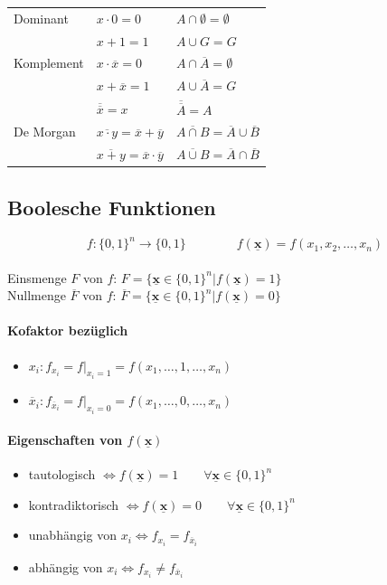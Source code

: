 \documentclass[6pt,a4paper]{scrartcl}
\renewcommand{\vec}[1]{\ensuremath{\underline{\boldsymbol {#1}}}}
\newcommand{\ra}[0]{\ensuremath{\rightarrow}} 									%
\renewcommand{\vec}[1]{\ensuremath{\underline{\boldsymbol {#1}}}}
\begin{document}
\begin{multicols*}{3}
\begin{tabular}{l|l|l}
		Dominant    & $x \cdot 0 = 0$                                       & $A \cap \emptyset = \emptyset$                        \\
		            & $x + 1 = 1$                                           & $A \cup G = G$                                        \\
		Komplement  & $x \cdot \overline{x} = 0$                            & $A \cap \overline{A} = \emptyset$                     \\
		            & $x + \overline{x} = 1$                                & $A \cup \overline{A} = G$                             \\
		            & $\overline{\overline{x}} = x$                         & $\overline{\overline{A}} = A$                         \\
		De Morgan   & $\overline{x \cdot y} = \overline{x} + \overline{y}$  & $\overline{A \cap B} = \overline{A} \cup \overline{B}$\\
		            & $\overline{x + y} = \overline{x} \cdot \overline{y}$ & $\overline{A \cup B} = \overline{A} \cap \overline{B}$
	\end{tabular}


	\subsection{Boolesche Funktionen}
	\begin{equation*}
	f:\{0,1\}^n\ra \{0,1\} \qquad \qquad f(\vec{x})=f(x_1,x_2,\dots,x_n)
	\end{equation*} \\
	Einsmenge $F$ von $f$: $F=\{\vec{x}\in \{0,1\}^n|f(\vec{x})=1\}$ \\
	Nullmenge $\overline F$ von $f$: $\overline F=\{\vec{x}\in \{0,1\}^n|f(\vec{x})=0\}$
	\paragraph{Kofaktor bezüglich}
	\begin{itemize}\itemsep0pt
	\item $x_i: f_{x_i}=f|_{x_i=1}=f(x_1,\dots,1,\dots,x_n)$
	\item $\overline x_i: f_{\overline x_i}=f|_{x_i=0}=f(x_1,\dots,0,\dots,x_n)$
	\end{itemize}
	\paragraph{Eigenschaften von $f(\vec{x})$}
	\begin{itemize}\itemsep0pt
		\item tautologisch $\Leftrightarrow f(\vec{x})=1 \qquad \forall \vec x \in \{0,1\}^n$
		\item kontradiktorisch $\Leftrightarrow f(\vec{x})=0 \qquad \forall \vec x \in \{0,1\}^n$
		\item unabhängig von $x_i \Leftrightarrow f_{x_i} = f_{\overline x_i}$
		\item abhängig von $x_i \Leftrightarrow f_{x_i} \ne f_{\overline x_i}$
	\end{itemize}


\end{multicols*}
\end{document}
